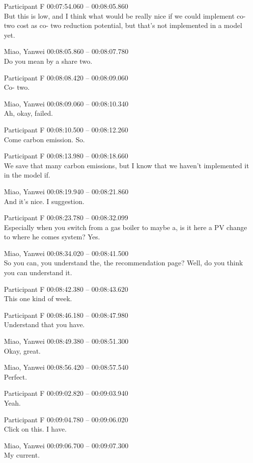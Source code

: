 {Participant F 00:07:54.060 -- 00:08:05.860 \\
But this is low, and I think what would be really nice if we could implement co- two cost as co- two reduction potential, but that's not implemented in a model yet.

Miao, Yanwei 00:08:05.860 -- 00:08:07.780 \\
Do you mean by a share two.

Participant F 00:08:08.420 -- 00:08:09.060 \\
Co- two.

Miao, Yanwei 00:08:09.060 -- 00:08:10.340 \\
Ah, okay, failed.

Participant F 00:08:10.500 -- 00:08:12.260 \\
Come carbon emission. So.

Participant F 00:08:13.980 -- 00:08:18.660 \\
We save that many carbon emissions, but I know that we haven't implemented it in the model if.

Miao, Yanwei 00:08:19.940 -- 00:08:21.860 \\
And it's nice. I suggestion.

Participant F 00:08:23.780 -- 00:08:32.099 \\
Especially when you switch from a gas boiler to maybe a, is it here a PV change to where he comes system? Yes.

Miao, Yanwei 00:08:34.020 -- 00:08:41.500 \\
So you can, you understand the, the recommendation page? Well, do you think you can understand it.

Participant F 00:08:42.380 -- 00:08:43.620 \\
This one kind of week.

Participant F 00:08:46.180 -- 00:08:47.980 \\
Understand that you have.

Miao, Yanwei 00:08:49.380 -- 00:08:51.300 \\
Okay, great.

Miao, Yanwei 00:08:56.420 -- 00:08:57.540 \\
Perfect.

Participant F 00:09:02.820 -- 00:09:03.940 \\
Yeah.

Participant F 00:09:04.780 -- 00:09:06.020 \\
Click on this. I have.

Miao, Yanwei 00:09:06.700 -- 00:09:07.300 \\
My current.

}
